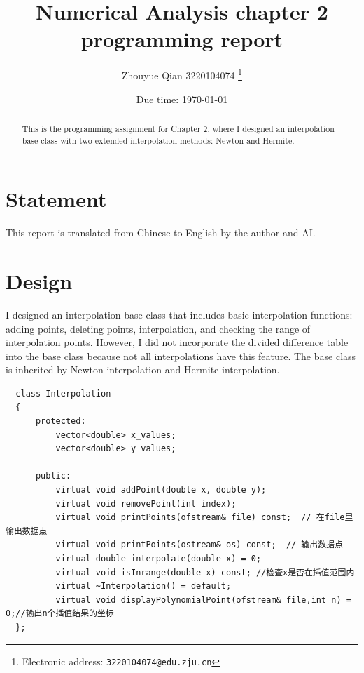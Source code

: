 \documentclass[a4paper]{article}
\begin{document}
\title{Numerical Analysis chapter 2 programming report}

\author{Zhouyue Qian 3220104074
  \thanks{Electronic address: \texttt{3220104074@edu.zju.cn}}}
  


\date{Due time: \today}

\maketitle

\begin{abstract}
  This is the programming assignment for Chapter 2, where I designed an interpolation base class with two extended interpolation methods: Newton and Hermite.
\end{abstract}

\section*{Statement}
  This report is translated from Chinese to English by the author and AI. \cite*{kimiassistant}

\section*{Design}
I designed an interpolation base class that includes basic interpolation functions: adding points, deleting points, interpolation, and checking the range of interpolation points. \cite*{openai2024chatgpt}
However, I did not incorporate the divided difference table into the base class because not all interpolations have this feature. 
The base class is inherited by Newton interpolation and Hermite interpolation. \cite*{deepseek}
\begin{lstlisting}
  class Interpolation
  {
      protected:
          vector<double> x_values;
          vector<double> y_values;
  
      public:
          virtual void addPoint(double x, double y);
          virtual void removePoint(int index);
          virtual void printPoints(ofstream& file) const;  // 在file里输出数据点
          virtual void printPoints(ostream& os) const;  // 输出数据点
          virtual double interpolate(double x) = 0;
          virtual void isInrange(double x) const; //检查x是否在插值范围内
          virtual ~Interpolation() = default;
          virtual void displayPolynomialPoint(ofstream& file,int n) = 0;//输出n个插值结果的坐标
  };
\end{lstlisting}
\end{document}
